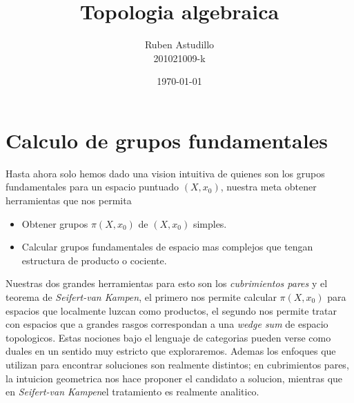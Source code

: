\documentclass[letterpaper]{article}
\newcommand{\vank}{\emph{Seifert-van Kampen}}
\theoremstyle{definition}
\theoremstyle{plain}
\theoremstyle{plain}
\theoremstyle{plain}
\theoremstyle{remark}
\begin{document}
\title{Topologia algebraica}
\author{Ruben Astudillo \\ 201021009-k}
\date{\today}
\maketitle




\section{Calculo de grupos fundamentales}
Hasta ahora solo hemos dado una vision intuitiva de quienes son los
grupos fundamentales para un espacio puntuado \((X,x_0)\), nuestra meta
obtener herramientas que nos permita
\begin{itemize}
\item Obtener grupos \(\pi (X, x_0)\) de \((X,x_0)\) simples.
\item Calcular grupos fundamentales de espacio mas complejos que tengan
  estructura de producto o cociente.
\end{itemize}
Nuestras dos grandes herramientas para esto son los \emph{cubrimientos
  pares} y el teorema de \vank , el primero nos
permite calcular \(\pi (X, x_0)\) para espacios que localmente luzcan
como productos, el segundo nos permite tratar con espacios que a grandes
rasgos correspondan a una \emph{wedge sum} de espacio topologicos. Estas
nociones bajo el lenguaje de categorias pueden verse como duales en un
sentido muy estricto que exploraremos. Ademas los enfoques que utilizan
para encontrar soluciones son realmente distintos; en cubrimientos pares,
la intuicion geometrica nos hace proponer el candidato a solucion,
mientras que en \vank el tratamiento es realmente analitico.


\end{document}
